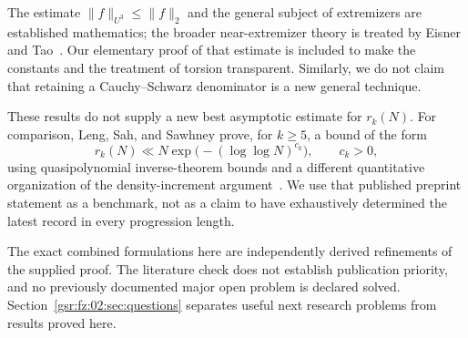 \documentclass[11pt,letterpaper]{article}
\numberwithin{equation}{section}
\theoremstyle{definition}
\theoremstyle{remark}
\newcommand{\1}{\mathbf 1}
\begin{document}
The estimate $\|f\|_{U^3}\leq\|f\|_2$ and the general subject of extremizers are established mathematics; the broader near-extremizer theory is treated by Eisner and Tao~\cite{eisnertao}. Our elementary proof of that estimate is included to make the constants and the treatment of torsion transparent. Similarly, we do not claim that retaining a Cauchy--Schwarz denominator is a new general technique.

These results do not supply a new best asymptotic estimate for $r_k(N)$. For comparison, Leng, Sah, and Sawhney prove, for $k\geq5$, a bound of the form
\[
 r_k(N)\ll N\exp\bigl(- (\log\log N)^{c_k}\bigr),\qquad c_k>0,
\]
using quasipolynomial inverse-theorem bounds and a different quantitative organization of the density-increment argument~\cite{lssbounds,lssinverse}. We use that published preprint statement as a benchmark, not as a claim to have exhaustively determined the latest record in every progression length.

The exact combined formulations here are independently derived refinements of the supplied proof. The literature check does not establish publication priority, and no previously documented major open problem is declared solved. Section~\ref{gsr:fz:02:sec:questions} separates useful next research problems from results proved here.
\end{document}

